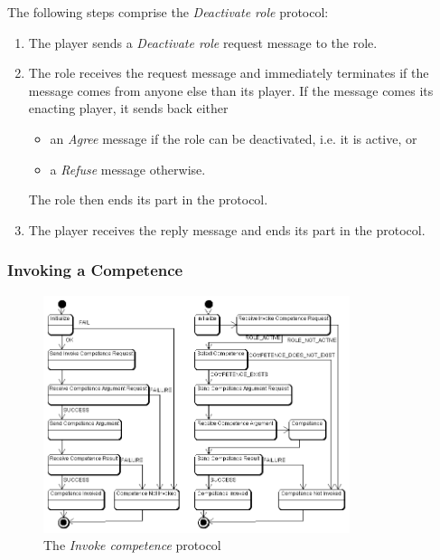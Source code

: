 The following steps comprise the \textit{Deactivate role} protocol:
\begin{enumerate}
	\item The player sends a \textit{Deactivate role} request message to the role.
	\item The role receives the request message and immediately terminates if the message comes from anyone else than its player.
	If the message comes its enacting player, it sends back either
	\begin{itemize}
		\item an \textit{Agree} message if the role can be deactivated, i.e. it is active, or
		\item a \textit{Refuse} message otherwise. 
	\end{itemize}
	The role then ends its part in the protocol.
	\item The player receives the reply message and ends its part in the protocol.
\end{enumerate}

\subsubsection{Invoking a Competence}

\begin{figure}[ht]
	\centering
	\includegraphics[width=0.8\textwidth]{images/thespian/invoke-competence-protocol.png}
	\caption{The \textit{Invoke competence} protocol}
	\label{figure:thespian-invoke-competence-protocol}
\end{figure}

